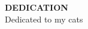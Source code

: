 \newpage
\thispagestyle{plain}%
\begin{center}
\vspace*{1.575in}
\textbf{DEDICATION}\\[2\baselineskip]
Dedicated to my cats
\end{center}%
\vfill
\newpage
